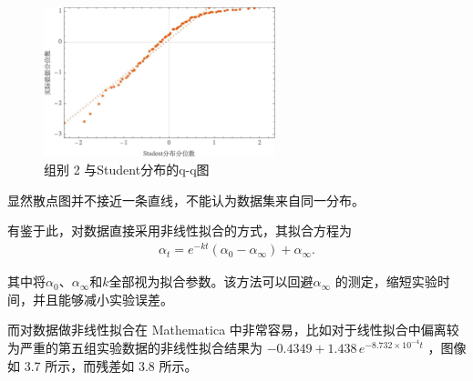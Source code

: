 \documentclass[12pt]{ctexart}
\numberwithin{equation}{section}
\begin{document}
\begin{figure}[ht]
    \centering
    \includegraphics[width=0.6\textwidth]{qq.jpg}
    \caption{组别 2 与Student分布的q-q图}
    \label{fig:qq}
\end{figure}

显然散点图并不接近一条直线，不能认为数据集来自同一分布。

有鉴于此，对数据直接采用非线性拟合的方式，其拟合方程为
\begin{align}
    \alpha_t =e^{-kt}(\alpha_0-\alpha_{\infty} )+ \alpha _{\infty}.
\end{align}

其中将$\alpha_0$、$\alpha_{\infty}$和$k$全部视为拟合参数。该方法可以回避$\alpha_\infty$
的测定，缩短实验时间，并且能够减小实验误差。

而对数据做非线性拟合在 Mathematica 中非常容易，比如对于线性拟合中偏离较为严重的第五组实验数据的非线性拟合结果为 $-0.4349 + 1.438 \,e^{-8.732\times 10^{-4} t}$ ，图像如 3.7 所示，而残差如 3.8 所示。
\end{document}
